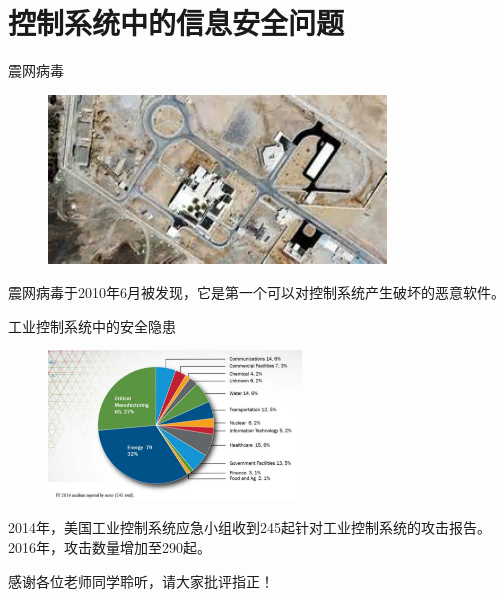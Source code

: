 \documentclass[10pt]{beamer}
\begin{document}
\section{控制系统中的信息安全问题}
\begin{frame}{震网病毒}
  \begin{figure}[ht]
    \centering
    \includegraphics[width=0.8\textwidth]{stuxnet.jpg}
  \end{figure}
  震网病毒于2010年6月被发现，它是第一个可以对控制系统产生破坏的恶意软件。
\end{frame}

\begin{frame}{工业控制系统中的安全隐患}
  \begin{figure}[ht]
    \centering
    \includegraphics[width=0.6\textwidth]{cert.jpg}
  \end{figure}
  2014年，美国工业控制系统应急小组收到245起针对工业控制系统的攻击报告。2016年，攻击数量增加至290起。
\end{frame}

\begin{frame}[standout]
  感谢各位老师同学聆听，请大家批评指正！
\end{frame}
\begin{frame}
\end{frame}
\end{document}
